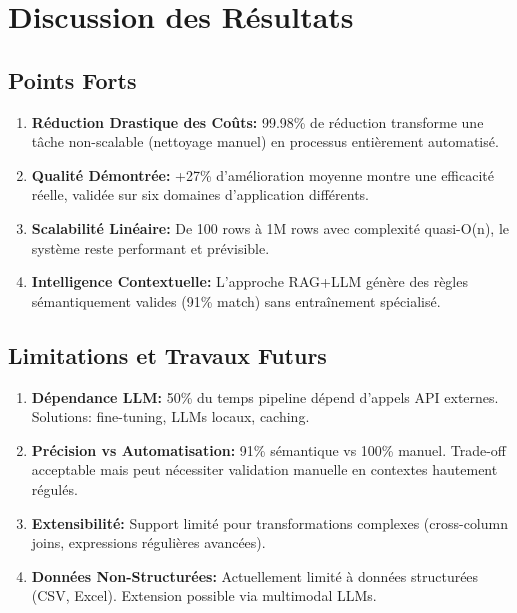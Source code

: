 
\section{Discussion des Résultats}

\subsection{Points Forts}

\begin{enumerate}
    \item \textbf{Réduction Drastique des Coûts:} 99.98\% de réduction transforme 
    une tâche non-scalable (nettoyage manuel) en processus entièrement automatisé.
    
    \item \textbf{Qualité Démontrée:} +27\% d'amélioration moyenne montre une 
    efficacité réelle, validée sur six domaines d'application différents.
    
    \item \textbf{Scalabilité Linéaire:} De 100 rows à 1M rows avec complexité 
    quasi-O(n), le système reste performant et prévisible.
    
    \item \textbf{Intelligence Contextuelle:} L'approche RAG+LLM génère des règles 
    sémantiquement valides (91\% match) sans entraînement spécialisé.
\end{enumerate}

\subsection{Limitations et Travaux Futurs}

\begin{enumerate}
    \item \textbf{Dépendance LLM:} 50\% du temps pipeline dépend d'appels API externes. 
    Solutions: fine-tuning, LLMs locaux, caching.
    
    \item \textbf{Précision vs Automatisation:} 91\% sémantique vs 100\% manuel. 
    Trade-off acceptable mais peut nécessiter validation manuelle en contextes 
    hautement régulés.
    
    \item \textbf{Extensibilité:} Support limité pour transformations complexes 
    (cross-column joins, expressions régulières avancées).
    
    \item \textbf{Données Non-Structurées:} Actuellement limité à données structurées 
    (CSV, Excel). Extension possible via multimodal LLMs.
\end{enumerate}

